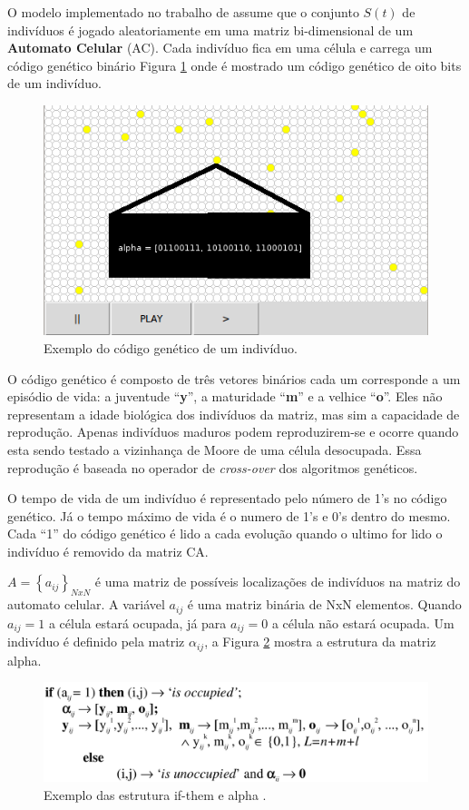 \documentclass[12pt]{article}
\begin{document}
O modelo implementado no trabalho de \cite{dzwinel:04} assume que o conjunto
$S(t)$ de indivíduos é jogado aleatoriamente em uma matriz bi-dimensional
de um \textbf{Automato Celular} (AC). Cada indivíduo fica em uma célula e
carrega um código genético binário Figura \ref{fig:codigo-genetico} onde é
mostrado um código genético de oito bits de um indivíduo.

\begin{figure}[ht]
\centering
\includegraphics[width=.3\textwidth]{imagens/codigo-genetico}
\caption{Exemplo do código genético de um indivíduo.}
\label{fig:codigo-genetico}
\end{figure}

O código genético é composto de três vetores binários cada um corresponde a um
episódio de vida: a juventude ``\textbf{y}'', a maturidade ``\textbf{m}'' e a
velhice ``\textbf{o}''. Eles não representam a idade biológica dos indivíduos
da matriz, mas sim a capacidade de reprodução. Apenas indivíduos maduros podem
reproduzirem-se e ocorre quando esta sendo testado a vizinhança de Moore de
uma célula desocupada. Essa reprodução é baseada no operador de
\textit{cross-over} dos algoritmos genéticos.

O tempo de vida de um indivíduo é representado pelo número de 1's no código
genético. Já o tempo máximo de vida é o numero de 1's e 0's dentro do mesmo.
Cada ``1'' do código genético é lido a cada evolução quando o ultimo for lido
o indivíduo é removido da matriz CA.

$A = \left \{a_{ij}\right \}_{NxN}$ é uma matriz de possíveis localizações de
indivíduos na matriz do automato celular. A variável $a_{ij}$ é uma matriz
binária de NxN elementos. Quando $a_{ij} = 1$ a célula estará ocupada, já para
$a_{ij} = 0$ a célula não estará ocupada. Um indivíduo é definido pela matriz
$\alpha _{ij}$, a Figura \ref{fig:estrutura-alpha} mostra a estrutura da
matriz alpha.

\begin{figure}[h!]
\centering
\includegraphics[width=.5\textwidth]{imagens/estrutura-alpha}
\caption{Exemplo das estrutura if-them e alpha \cite{dzwinel:04}.}
\label{fig:estrutura-alpha}
\end{figure}
\end{document}
